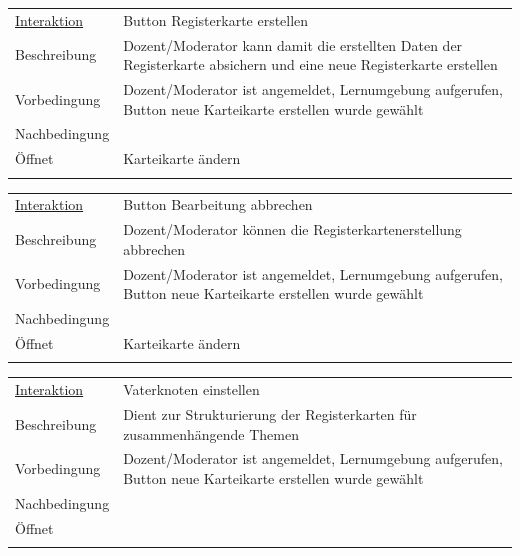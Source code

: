 \documentclass[12pt,a4paper]{article}
\begin{document}
{\begin{tabular}{l p{12cm}}
\underline{Interaktion} & Button Registerkarte erstellen   \\ 
Beschreibung   	 		& Dozent/Moderator kann damit die erstellten Daten der Registerkarte absichern und eine neue Registerkarte erstellen\\
Vorbedingung	 		& Dozent/Moderator ist angemeldet, Lernumgebung aufgerufen, Button neue Karteikarte erstellen wurde gewählt\\
Nachbedingung	 		& \\
Öffnet			 		& \glqq Karteikarte ändern\grqq \\\\
\end{tabular}

\begin{tabular}{l p{12cm}}
\underline{Interaktion} & Button Bearbeitung abbrechen   \\ 
Beschreibung   	 		& Dozent/Moderator können die Registerkartenerstellung abbrechen\\
Vorbedingung	 		& Dozent/Moderator ist angemeldet, Lernumgebung aufgerufen, Button neue Karteikarte erstellen wurde gewählt\\
Nachbedingung	 		& \\
Öffnet			 		& \glqq Karteikarte ändern\grqq \\\\
\end{tabular}

\begin{tabular}{l p{12cm}}
\underline{Interaktion} & Vaterknoten einstellen   \\ 
Beschreibung   	 		& Dient zur Strukturierung der Registerkarten für zusammenhängende Themen\\
Vorbedingung	 		& Dozent/Moderator ist angemeldet, Lernumgebung aufgerufen, Button neue Karteikarte erstellen wurde gewählt\\
Nachbedingung	 		& \\
Öffnet			 		& \\\\
\end{tabular}

\begin{figure}[H]
	\centering

\end{figure}}
\end{document}
